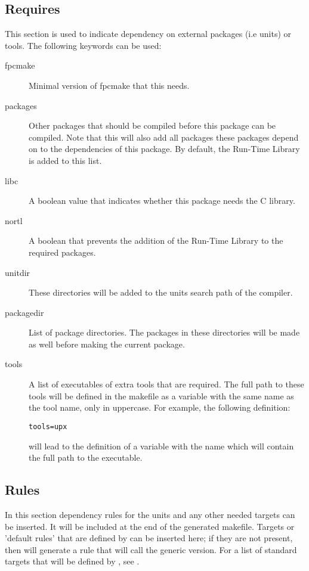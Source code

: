 \subsection{Requires}
This section is used to indicate dependency on external packages (i.e units)
or tools. The following keywords can be used:
\begin{description}
\item[fpcmake] Minimal version of fpcmake that this  needs.
\item[packages] Other packages that should be compiled before this package
can be compiled. Note that this will also add all packages these packages
depend on to the dependencies of this package. By default, the \fpc Run-Time
Library is added to this list.
\item[libc] A boolean value that indicates whether this package needs the C
library.
\item[nortl] A boolean that prevents the addition of the \fpc Run-Time 
Library to the required packages.
\item[unitdir] These directories will be added to the units search path of
the compiler.
\item[packagedir] List of package directories. The packages in these
directories will be made as well before making the current package.
\item[tools] A list of executables of extra tools that are required. The
full path to these tools will be defined in the makefile as a variable with
the same name as the tool name, only in uppercase. For example, the
following definition:
\begin{verbatim}
tools=upx
\end{verbatim}
will lead to the definition of a variable with the name  which will
contain the full path to the  executable.
\end{description}

\subsection{Rules}
In this section dependency rules for the units and any other needed 
targets can be inserted. It will be included at the end of the generated
makefile. Targets or 'default rules' that are defined by \fpcmake{} 
can be inserted here; if they are not present, then \fpcmake{} will generate
a rule that will call the generic  version. For a list of standard 
targets that will be defined by \fpcmake{}, see .

